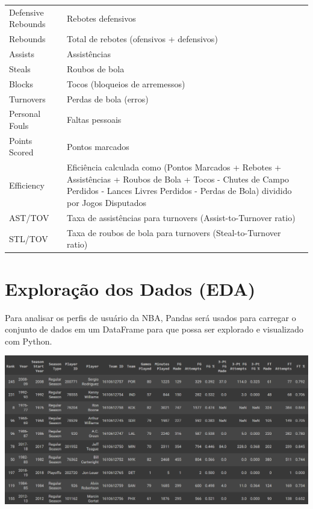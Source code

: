 \documentclass[
]{book}
\begin{document}
\begin{longtable}[]{@{}
  >{\raggedright\arraybackslash}p{}
  >{\raggedright\arraybackslash}p{}@{}}
Defensive Rebounds & Rebotes defensivos \\
Rebounds & Total de rebotes (ofensivos + defensivos) \\
Assists & Assistências \\
Steals & Roubos de bola \\
Blocks & Tocos (bloqueios de arremessos) \\
Turnovers & Perdas de bola (erros) \\
Personal Fouls & Faltas pessoais \\
Points Scored & Pontos marcados \\
Efficiency & Eficiência calculada como (Pontos Marcados + Rebotes + Assistências + Roubos de Bola + Tocos - Chutes de Campo Perdidos - Lances Livres Perdidos - Perdas de Bola) dividido por Jogos Disputados \\
AST/TOV & Taxa de assistências para turnovers (Assist-to-Turnover ratio) \\
STL/TOV & Taxa de roubos de bola para turnovers (Steal-to-Turnover ratio) \\
\bottomrule()
\end{longtable}

\hypertarget{explorauxe7uxe3o-dos-dados-eda}{%
\chapter{Exploração dos Dados (EDA)}\label{explorauxe7uxe3o-dos-dados-eda}}

Para analisar os perfis de usuário da NBA, Pandas será usados \hspace{0pt}\hspace{0pt}para carregar o conjunto de dados em um DataFrame para que possa ser explorado e visualizado com Python.

\includegraphics{imagens/dataframe1.png}
\end{document}
